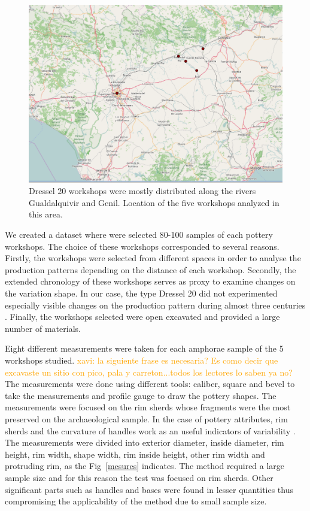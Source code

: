\documentclass[review]{elsarticle}
\newcommand{\memo}[2]{\textcolor{#1}{#2}}
\newcommand{\xavi}[1]{\memo{orange}{xavi: #1\\}}
\begin{document}
\begin{figure}[htp]
	\centering
\includegraphics[scale=0.30]{romanworkshop.png}
\caption{Dressel 20 workshops were mostly distributed along the rivers Gualdalquivir and Genil. Location of the five workshops analyzed in this area.}
\label{romanworkshop}
\end{figure} 


We created a dataset where were selected 80-100 samples of each pottery workshops. The choice of these workshops corresponded to several reasons. Firstly, the workshops were selected from different spaces in order to analyse the production patterns depending on the distance of each workshop. Secondly, the extended chronology of these workshops serves as proxy to examine changes on the variation shape. In our case, the type Dressel 20 did not experimented especially visible changes on the production pattern during almost three centuries \citep{berni_dressel_2016}. Finally, the workshops selected were open excavated and provided a large number of materials.   

Eight different measurements were taken for each amphorae sample of the 5 workshops studied. \xavi{la siguiente frase es necesaria? Es como decir que excavaste un sitio con pico, pala y carreton...todos los lectores lo saben ya no?} The measurements were done using different tools: caliber, square and bevel to take the measurements and profile gauge to draw the pottery shapes. The measurements were focused on the rim sherds whose fragments were the most preserved on the archaeological sample. In the case of pottery attributes, rim sherds and the curvature of handles work as an useful indicators of variability \citep{berni_millet_epigrafianforica_2008}.
The measurements were divided into exterior diameter, inside diameter, rim height, rim width, shape width, rim inside height, other rim width and protruding rim, as the Fig~\ref{mesures} indicates. The method required a large sample size and for this reason the test was focused on rim sherds. Other significant parts such as handles and bases were found in lesser quantities thus compromising the applicability of the method due to small sample size.
\end{document}
